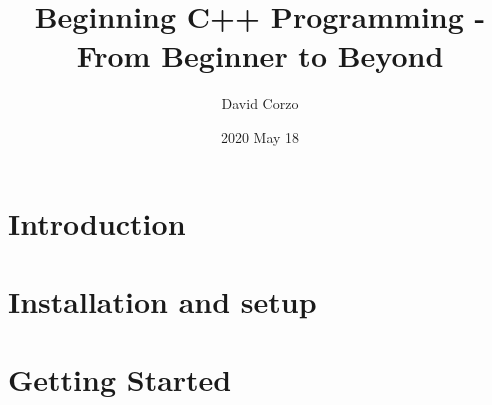 \documentclass[openany]{book}
\title{Beginning C++ Programming - From Beginner to Beyond}
\date{2020 May 18} %
\author{David Corzo}
\begin{document}
\maketitle
\tableofcontents

\chapter{Introduction}


\chapter{Installation and setup}


% 

\chapter{Getting Started}


% 

% 


% 

% 

% 
\end{document}
